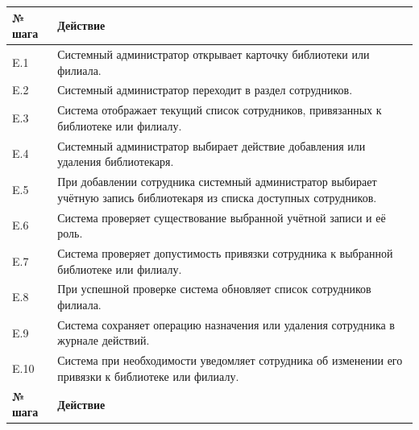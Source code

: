 \documentclass[12pt,a4paper]{article}
\begin{document}
\begin{xltabular}{\textwidth}{
				|>{\raggedright\arraybackslash}p{2.7cm}
				|>{\raggedright\arraybackslash}X|
			}
			
			\textbf{№ шага} & \textbf{Действие} \\
			\hline
			
			E.1 & Системный администратор открывает карточку библиотеки или филиала. \\
			\hline
			E.2 & Системный администратор переходит в раздел сотрудников. \\
			\hline
			E.3 & Система отображает текущий список сотрудников, привязанных к
			библиотеке или филиалу. \\
			\hline
			E.4 & Системный администратор выбирает действие добавления или удаления
			библиотекаря. \\
			\hline
			E.5 & При добавлении сотрудника системный администратор выбирает учётную
			запись библиотекаря из списка доступных сотрудников. \\
			\hline
			E.6 & Система проверяет существование выбранной учётной записи и её роль. \\
			\hline
			E.7 & Система проверяет допустимость привязки сотрудника к выбранной
			библиотеке или филиалу. \\
			\hline
			E.8 & При успешной проверке система обновляет список сотрудников филиала. \\
			\hline
			E.9 & Система сохраняет операцию назначения или удаления сотрудника в
			журнале действий. \\
			\hline
			E.10 & Система при необходимости уведомляет сотрудника об изменении его
			привязки к библиотеке или филиалу. \\
			\hline
			
			
			\textbf{№ шага} & \textbf{Действие} \\
			\hline
			

\end{xltabular}
\end{document}
